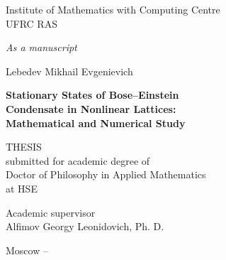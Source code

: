 \begin{titlepage}
\thispagestyle{empty}
\enlargethispage{1cm}
\vspace*{-2cm}

\begin{center}
	Institute of Mathematics with Computing Centre \\ UFRC RAS
\end{center}

\vskip1cm
	
\begin{flushright}
	\emph{As a manuscript}
\end{flushright}
	
\vskip3cm

\begin{center}
	{\large Lebedev Mikhail Evgenievich}
	\vskip1cm
	{\Large\bfseries Stationary States of Bose--Einstein \\ Condensate in Nonlinear Lattices: \\ Mathematical and Numerical Study\par}
	\vskip1.5cm
	{THESIS \\ submitted for academic degree of \\ Doctor of Philosophy in Applied Mathematics \\ at HSE}
\end{center}

\vskip2cm

\hspace{8cm}\begin{minipage}{0.45\linewidth}
	Academic supervisor \\
	Alfimov Georgy Leonidovich, Ph. D.
\end{minipage}

\vfill

\begin{center}
	{Moscow -- \the\year}
\end{center}

\normalfont\clearpage
\end{titlepage}
